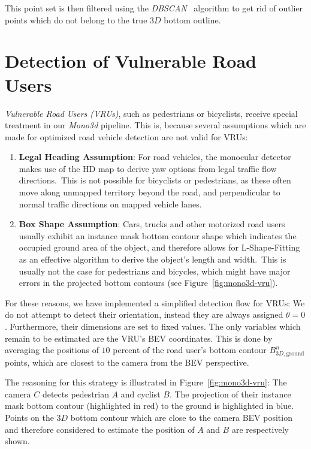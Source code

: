This point set is then filtered using the \textit{DBSCAN}~\cite{schubert2017dbscan} algorithm to get rid of outlier points which do not belong to the true $3D$ bottom outline.

\section{Detection of Vulnerable Road Users}
\label{sec:pedcyc}

\textit{Vulnerable Road Users (VRUs)}, such as pedestrians or bicyclists, receive special treatment in our \textit{Mono3d} pipeline.
This is, because several assumptions which are made for optimized road vehicle detection are not valid for VRUs:

\begin{enumerate}
    \item \textbf{Legal Heading Assumption}: For road vehicles, the monocular detector makes use of the HD map to derive yaw options from legal traffic flow directions.\ This is not possible for bicyclists or pedestrians, as these often move along unmapped territory beyond the road, and perpendicular to normal traffic directions on mapped vehicle lanes.
    \item \textbf{Box Shape Assumption}: Cars, trucks and other motorized road users usually exhibit an instance mask bottom contour shape which indicates the occupied ground area of the object, and therefore allows for L-Shape-Fitting as an effective algorithm to derive the object's length and width.\ This is usually not the case for pedestrians and bicycles, which might have major errors in the projected bottom contours (see Figure~\ref{fig:mono3d-vru}).
\end{enumerate}

For these reasons, we have implemented a simplified detection flow for VRUs: We do not attempt to detect their orientation, instead they are always assigned $\theta=0$.
Furthermore, their dimensions are set to fixed values.
The only variables which remain to be estimated are the VRU's BEV coordinates.
This is done by averaging the positions of $10$ percent of the road user's bottom contour $B^n_{3D,\text{ground}}$ points, which are closest to the camera from the BEV perspective.

The reasoning for this strategy is illustrated in Figure~\ref{fig:mono3d-vru}:
The camera $C$ detects pedestrian $A$ and cyclist $B$.
The projection of their instance mask bottom contour (highlighted in red) to the ground is highlighted in blue.
Points on the $3D$ bottom contour which are close to the camera BEV position and therefore considered to estimate the position of $A$ and $B$ are respectively shown.

